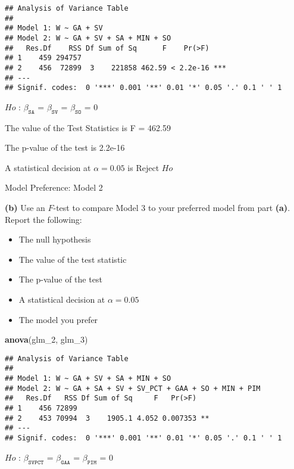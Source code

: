 \documentclass[
]{article}
\newenvironment{Shaded}{\begin{snugshade}}{\end{snugshade}}
\newcommand{\DecValTok}[1]{\textcolor[rgb]{0.00,0.00,0.81}{#1}}
\newcommand{\KeywordTok}[1]{\textcolor[rgb]{0.13,0.29,0.53}{\textbf{#1}}}
\newcommand{\NormalTok}[1]{#1}
\providecommand{\tightlist}{%
  \setlength{\itemsep}{0pt}\setlength{\parskip}{0pt}}
\begin{document}
\begin{verbatim}
## Analysis of Variance Table
## 
## Model 1: W ~ GA + SV
## Model 2: W ~ GA + SV + SA + MIN + SO
##   Res.Df    RSS Df Sum of Sq      F    Pr(>F)    
## 1    459 294757                                  
## 2    456  72899  3    221858 462.59 < 2.2e-16 ***
## ---
## Signif. codes:  0 '***' 0.001 '**' 0.01 '*' 0.05 '.' 0.1 ' ' 1
\end{verbatim}

\(Ho\) : \(\beta_{\texttt{SA}}\) = \(\beta_{\texttt{SV}}\) =
\(\beta_{\texttt{SO}}\) = 0

The value of the Test Statistics is F = 462.59

The p-value of the test is 2.2e-16

A statistical decision at \(\alpha = 0.05\) is Reject \(Ho\)

Model Preference: Model 2

\textbf{(b)} Use an \(F\)-test to compare Model 3 to your preferred
model from part \textbf{(a)}. Report the following:

\begin{itemize}
\tightlist
\item
  The null hypothesis
\item
  The value of the test statistic
\item
  The p-value of the test
\item
  A statistical decision at \(\alpha = 0.05\)
\item
  The model you prefer
\end{itemize}

\begin{Shaded}
\begin{Highlighting}[]
\KeywordTok{anova}\NormalTok{(glm_}\DecValTok{2}\NormalTok{, glm_}\DecValTok{3}\NormalTok{)}
\end{Highlighting}
\end{Shaded}

\begin{verbatim}
## Analysis of Variance Table
## 
## Model 1: W ~ GA + SV + SA + MIN + SO
## Model 2: W ~ GA + SA + SV + SV_PCT + GAA + SO + MIN + PIM
##   Res.Df   RSS Df Sum of Sq     F   Pr(>F)   
## 1    456 72899                               
## 2    453 70994  3    1905.1 4.052 0.007353 **
## ---
## Signif. codes:  0 '***' 0.001 '**' 0.01 '*' 0.05 '.' 0.1 ' ' 1
\end{verbatim}

\(Ho\) : \(\beta_{\texttt{SVPCT}}\) = \(\beta_{\texttt{GAA}}\) =
\(\beta_{\texttt{PIM}}\) = 0
\end{document}
